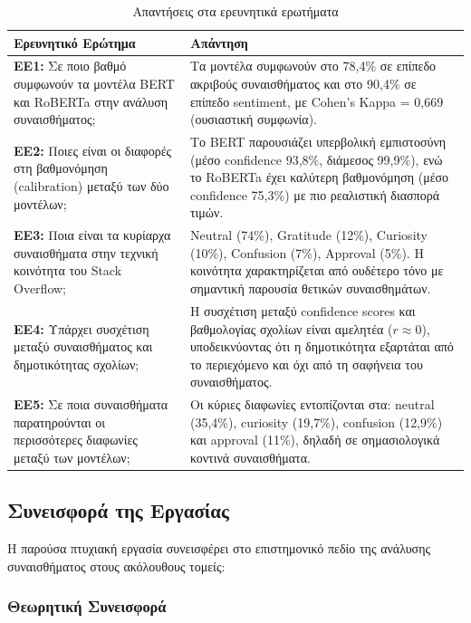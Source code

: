\documentclass[a4paper,11pt,oneside,openany]{ioniothesis}
\begin{document}
\begin{table}[H]
\centering
\caption{Απαντήσεις στα ερευνητικά ερωτήματα}
\label{tab:research_questions_answers}
\small
\begin{tabular}{@{}p{5.5cm}p{8.5cm}@{}}
\toprule
\textbf{Ερευνητικό Ερώτημα} & \textbf{Απάντηση} \\
\midrule
\textbf{ΕΕ1:} Σε ποιο βαθμό συμφωνούν τα μοντέλα BERT και RoBERTa στην ανάλυση συναισθήματος; & 
Τα μοντέλα συμφωνούν στο 78,4\% σε επίπεδο ακριβούς συναισθήματος και στο 90,4\% σε επίπεδο sentiment, με Cohen's Kappa = 0,669 (ουσιαστική συμφωνία). \\
\midrule
\textbf{ΕΕ2:} Ποιες είναι οι διαφορές στη βαθμονόμηση (calibration) μεταξύ των δύο μοντέλων; & 
Το BERT παρουσιάζει υπερβολική εμπιστοσύνη (μέσο confidence 93,8\%, διάμεσος 99,9\%), ενώ το RoBERTa έχει καλύτερη βαθμονόμηση (μέσο confidence 75,3\%) με πιο ρεαλιστική διασπορά τιμών. \\
\midrule
\textbf{ΕΕ3:} Ποια είναι τα κυρίαρχα συναισθήματα στην τεχνική κοινότητα του Stack Overflow; & 
Neutral (74\%), Gratitude (12\%), Curiosity (10\%), Confusion (7\%), Approval (5\%). Η κοινότητα χαρακτηρίζεται από ουδέτερο τόνο με σημαντική παρουσία θετικών συναισθημάτων. \\
\midrule
\textbf{ΕΕ4:} Υπάρχει συσχέτιση μεταξύ συναισθήματος και δημοτικότητας σχολίων; & 
Η συσχέτιση μεταξύ confidence scores και βαθμολογίας σχολίων είναι αμελητέα ($r \approx 0$), υποδεικνύοντας ότι η δημοτικότητα εξαρτάται από το περιεχόμενο και όχι από τη σαφήνεια του συναισθήματος. \\
\midrule
\textbf{ΕΕ5:} Σε ποια συναισθήματα παρατηρούνται οι περισσότερες διαφωνίες μεταξύ των μοντέλων; & 
Οι κύριες διαφωνίες εντοπίζονται στα: neutral (35,4\%), curiosity (19,7\%), confusion (12,9\%) και approval (11\%), δηλαδή σε σημασιολογικά κοντινά συναισθήματα. \\
\bottomrule
\end{tabular}
\end{table}

\subsection{Συνεισφορά της Εργασίας}
\label{sec:Συνεισφορά της Εργασίας}

Η παρούσα πτυχιακή εργασία συνεισφέρει στο επιστημονικό πεδίο της ανάλυσης συναισθήματος στους ακόλουθους τομείς:

\subsubsection{Θεωρητική Συνεισφορά}
\end{document}
